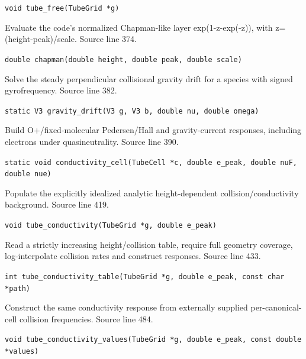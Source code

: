 \begin{description}[style=nextline,leftmargin=0pt,labelindent=0pt,labelwidth=0pt,labelsep=0pt]
{\small\nolinkurl{void tube_free(TubeGrid *g)}}
\item[\texttt{chapman}] Evaluate the code's normalized Chapman-like layer exp(1-z-exp(-z)), with z=(height-peak)/scale. Source line 374.\par
{\small\nolinkurl{double chapman(double height, double peak, double scale)}}
\item[\texttt{gravity\_drift}] Solve the steady perpendicular collisional gravity drift for a species with signed gyrofrequency. Source line 382.\par
{\small\nolinkurl{static V3 gravity_drift(V3 g, V3 b, double nu, double omega)}}
\item[\texttt{conductivity\_cell}] Build O+/fixed-molecular Pedersen/Hall and gravity-current responses, including electrons under quasineutrality. Source line 390.\par
{\small\nolinkurl{static void conductivity_cell(TubeCell *c, double e_peak, double nuF, double nue)}}
\item[\texttt{tube\_conductivity}] Populate the explicitly idealized analytic height-dependent collision/conductivity background. Source line 419.\par
{\small\nolinkurl{void tube_conductivity(TubeGrid *g, double e_peak)}}
\item[\texttt{tube\_conductivity\_table}] Read a strictly increasing height/collision table, require full geometry coverage, log-interpolate collision rates and construct responses. Source line 433.\par
{\small\nolinkurl{int tube_conductivity_table(TubeGrid *g, double e_peak, const char *path)}}
\item[\texttt{tube\_conductivity\_values}] Construct the same conductivity response from externally supplied per-canonical-cell collision frequencies. Source line 484.\par
{\small\nolinkurl{void tube_conductivity_values(TubeGrid *g, double e_peak, const double *values)}}
\end{description}
